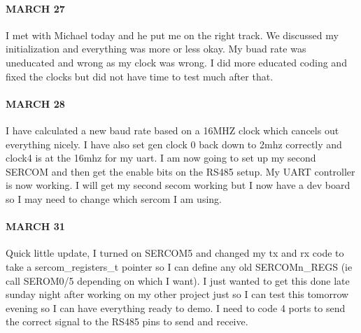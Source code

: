 \documentclass{article}
\begin{document}
\paragraph{MARCH 27} I met with Michael today and he put me on the right track. We discussed my initialization and everything was more or less okay. My buad rate was uneducated and wrong as my clock was wrong. I did more educated coding and fixed the clocks but did not have time to test much after that. 
\paragraph{MARCH 28} I have calculated a new baud rate based on a 16MHZ clock which cancels out everything nicely. I have also set gen clock 0 back down to 2mhz correctly and clock4 is at the 16mhz for my uart. I am now going to set up my second SERCOM and then get the enable bits on the RS485 setup. My UART controller is now working. I will get my second secom working but I now have a dev board so I may need to change which sercom I am using. 
\paragraph{MARCH 31} Quick little update, I turned on SERCOM5 and changed my tx and rx code to take a sercom\_registers\_t pointer so I can define any old SERCOMn\_REGS (ie call SEROM0/5 depending on which I want). I just wanted to get this done late sunday night after working on my other project just so I can test this tomorrow evening so I can have everything ready to demo. I need to code 4 ports to send the correct signal to the RS485 pins to send and receive.  




\end{document}
